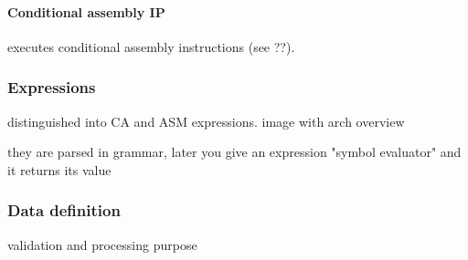 \paragraph*{Conditional assembly IP} executes conditional assembly instructions (see ??). 

\subsubsection{Expressions}

distinguished into CA and ASM expressions. 
image with arch
overview

they are parsed in grammar, later you give an expression "symbol evaluator" and it returns its value


\subsubsection{Data definition}

validation and processing purpose